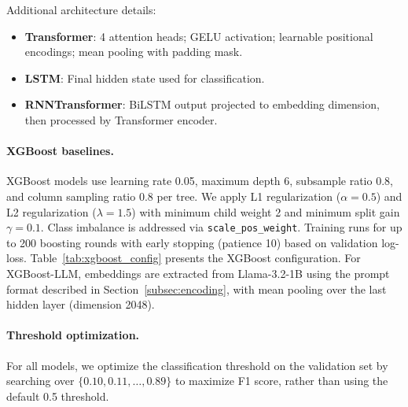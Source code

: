 \documentclass[fullpaper]{nldl}
\theoremstyle{plain}
\theoremstyle{definition}
\theoremstyle{remark}
\begin{document}
Additional architecture details:
\begin{itemize}
    \item \textbf{Transformer}: 4 attention heads; GELU activation; learnable positional encodings; mean pooling with padding mask.
    \item \textbf{LSTM}: Final hidden state used for classification.
    \item \textbf{RNNTransformer}: BiLSTM output projected to embedding dimension, then processed by Transformer encoder.
\end{itemize}


\paragraph{XGBoost baselines.}
XGBoost models use learning rate 0.05, maximum depth 6, subsample ratio 0.8, and column sampling ratio 0.8 per tree. We apply L1 regularization ($\alpha=0.5$) and L2 regularization ($\lambda=1.5$) with minimum child weight 2 and minimum split gain $\gamma=0.1$. Class imbalance is addressed via \texttt{scale\_pos\_weight}. Training runs for up to 200 boosting rounds with early stopping (patience 10) based on validation log-loss. Table~\ref{tab:xgboost_config} presents the XGBoost configuration. For XGBoost-LLM, embeddings are extracted from Llama-3.2-1B using the prompt format described in Section~\ref{subsec:encoding}, with mean pooling over the last hidden layer (dimension 2048).

\paragraph{Threshold optimization.}
For all models, we optimize the classification threshold on the validation set by searching over $\{0.10, 0.11, \ldots, 0.89\}$ to maximize F1 score, rather than using the default 0.5 threshold.
\end{document}
